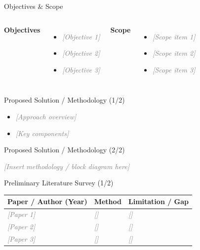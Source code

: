 \documentclass[aspectratio=169,11pt]{beamer}
\newcommand{\placeholder}[1]{\textcolor{gray}{\textit{[#1]}}}
\begin{document}
\begin{frame}{Objectives \& Scope}
  \begin{columns}[T]
      \textbf{Objectives}
      \begin{itemize}
        \item \placeholder{Objective 1}
        \item \placeholder{Objective 2}
        \item \placeholder{Objective 3}
      \end{itemize}
      \textbf{Scope}
      \begin{itemize}
        \item \placeholder{Scope item 1}
        \item \placeholder{Scope item 2}
        \item \placeholder{Scope item 3}
      \end{itemize}
  \end{columns}
\end{frame}

\begin{frame}{Proposed Solution / Methodology (1/2)}
  \begin{itemize}
    \item \placeholder{Approach overview}
    \item \placeholder{Key components}
  \end{itemize}
\end{frame}

\begin{frame}{Proposed Solution / Methodology (2/2)}
  \begin{center}
    \placeholder{Insert methodology / block diagram here}
  \end{center}
\end{frame}

\begin{frame}{Preliminary Literature Survey (1/2)}
  \small
  \begin{tabular}{@{}p{}p{}p{}@{}}
    \toprule
    \textbf{Paper / Author (Year)} & \textbf{Method} & \textbf{Limitation / Gap} \\
    \midrule
    \placeholder{Paper 1} & \placeholder{} & \placeholder{} \\
    \placeholder{Paper 2} & \placeholder{} & \placeholder{} \\
    \placeholder{Paper 3} & \placeholder{} & \placeholder{} \\
    \bottomrule
  \end{tabular}
\end{frame}
\end{document}
